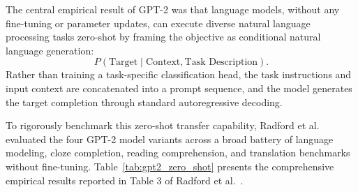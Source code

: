 \documentclass[../../main.tex]{subfiles}
\begin{document}
The central empirical result of GPT-2 was that language models, without any fine-tuning or parameter updates, can execute diverse natural language processing tasks zero-shot by framing the objective as conditional natural language generation:
\begin{equation}
P(\text{Target} \mid \text{Context}, \text{Task Description}).
\label{eq:zero_shot_conditional}
\end{equation}
Rather than training a task-specific classification head, the task instructions and input context are concatenated into a prompt sequence, and the model generates the target completion through standard autoregressive decoding.

To rigorously benchmark this zero-shot transfer capability, Radford et al. evaluated the four GPT-2 model variants across a broad battery of language modeling, cloze completion, reading comprehension, and translation benchmarks without fine-tuning. Table~\ref{tab:gpt2_zero_shot} presents the comprehensive empirical results reported in Table 3 of Radford et al.~\cite{radford2019}.
\end{document}
